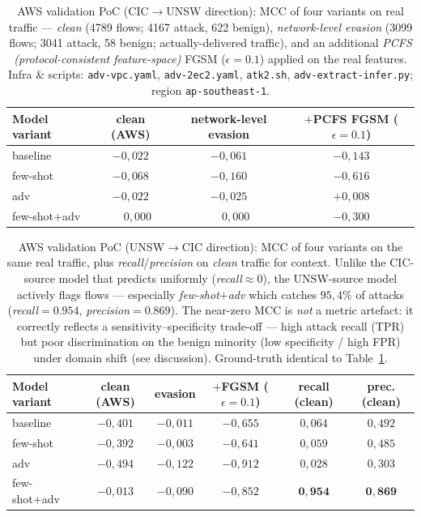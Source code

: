 \documentclass[11pt,a4paper]{article}
\begin{document}
\begin{table}[h]
\centering
\caption{AWS validation PoC (CIC$\rightarrow$UNSW direction): MCC of four variants on
real traffic --- \emph{clean} (4789 flows; 4167 attack, 622 benign),
\emph{network-level evasion} (3099 flows; 3041 attack, 58 benign; actually-delivered
traffic), and an additional \emph{PCFS (protocol-consistent feature-space)} FGSM
($\epsilon=0.1$) applied on the real features. Infra \&
scripts: \texttt{adv-vpc.yaml}, \texttt{adv-2ec2.yaml}, \texttt{atk2.sh},
\texttt{adv-extract-infer.py}; region \texttt{ap-southeast-1}.}
\label{tab:aws}
\small
\begin{tabular}{lccc}
\toprule
Model variant & clean (AWS) & network-level evasion & $+$PCFS FGSM ($\epsilon=0.1$) \\
\midrule
baseline     & $-0{,}022$ & $-0{,}061$ & $-0{,}143$ \\
few-shot     & $-0{,}068$ & $-0{,}160$ & $-0{,}616$ \\
adv          & $-0{,}022$ & $-0{,}025$ & $+0{,}008$ \\
few-shot+adv & $\phantom{-}0{,}000$ & $\phantom{-}0{,}000$ & $-0{,}300$ \\
\bottomrule
\end{tabular}
\end{table}

\begin{table}[h]
\centering
\caption{AWS validation PoC (UNSW$\rightarrow$CIC direction): MCC of four variants on
the same real traffic, plus \emph{recall}/\emph{precision} on \emph{clean} traffic
for context. Unlike the CIC-source model that predicts uniformly (\emph{recall}$\approx
0$), the UNSW-source model actively flags flows --- especially \emph{few-shot$+$adv}
which catches $95{,}4\%$ of attacks (\emph{recall}$=0.954$, \emph{precision}$=0.869$).
The near-zero MCC is \emph{not} a metric artefact: it correctly reflects a
sensitivity--specificity trade-off --- high attack recall (TPR) but poor
discrimination on the benign minority (low specificity / high FPR) under domain
shift (see discussion). Ground-truth identical to Table~\ref{tab:aws}.}
\label{tab:aws_unsw}
\small
\begin{tabular}{lccccc}
\toprule
Model variant & clean (AWS) & evasion & $+$FGSM ($\epsilon{=}0.1$) & recall (clean) & prec. (clean) \\
\midrule
baseline     & $-0{,}401$ & $-0{,}011$ & $-0{,}655$ & $0{,}064$ & $0{,}492$ \\
few-shot     & $-0{,}392$ & $-0{,}003$ & $-0{,}641$ & $0{,}059$ & $0{,}485$ \\
adv          & $-0{,}494$ & $-0{,}122$ & $-0{,}912$ & $0{,}028$ & $0{,}303$ \\
few-shot+adv & $-0{,}013$ & $-0{,}090$ & $-0{,}852$ & $\mathbf{0{,}954}$ & $\mathbf{0{,}869}$ \\
\bottomrule
\end{tabular}
\end{table}
\end{document}
